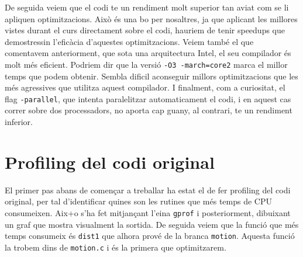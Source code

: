 De seguida veiem que el codi te un rendiment molt superior tan aviat com se li apliquen optimitzacions. Això és una bo per nosaltres, ja que aplicant les millores vistes durant el curs directament sobre el codi, hauriem de tenir speedups que demostressin l'eficàcia d'aquestes optimitzacions.
Veiem també el que comentavem anteriorment, que sota una arquitectura Intel, el seu compilador és molt més eficient. Podriem dir que la versió \texttt{-O3 -march=core2} marca el millor temps que podem obtenir. Sembla dificil aconseguir millors optimitzacions que les més agressives que utilitza aquest compilador.
I finalment, com a curiositat, el flag \texttt{-parallel}, que intenta paralelitzar automaticament el codi, i en aquest cas correr sobre dos processadors, no aporta cap guany, al contrari, te un rendiment inferior.

\section{Profiling del codi original}

El primer pas abans de començar a treballar ha estat el de fer profiling del codi original, per tal d'identificar quines son les rutines que més temps de CPU consumeixen. Aix+o s'ha fet mitjançant l'eina \texttt{gprof} i posteriorment, dibuixant un graf que mostra visualment la sortida. De seguida veiem que la funció que més temps consumeix és \texttt{dist1} que alhora prové de la branca \texttt{motion}. Aquesta funció la trobem dins de \texttt{motion.c} i és la primera que optimitzarem.

